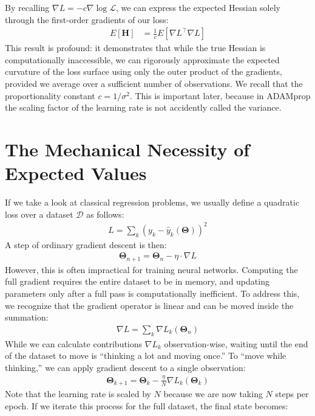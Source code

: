 By recalling $\nabla L = -c \nabla \log \mathcal{L}$, we can express the expected Hessian solely through the first-order gradients of our loss:
\begin{align}
	E[\boldsymbol{H}] &= \frac{1}{c} E\left[ \nabla L^\top \nabla L \right]
\end{align}
This result is profound: it demonstrates that while the true Hessian is computationally inaccessible, we can rigorously approximate the expected curvature of the loss surface using only the outer product of the gradients, provided we average over a sufficient number of observations. We recall that the proportionality constant $c=1/\sigma^2$. This is important later, because in ADAMprop the scaling factor of the learning rate is not accidently called the variance.
\section{The Mechanical Necessity of Expected Values}
If we take a look at classical regression problems, we usually define a quadratic loss over a dataset $\mathcal{D}$ as follows:
\begin{align}
	L = \sum\limits_k \left( y_k - \hat{y}_k(\boldsymbol{\Theta}) \right)^2
\end{align}
A step of ordinary gradient descent is then:
\begin{align}
	\boldsymbol{\Theta}_{n+1} = \boldsymbol{\Theta}_{n} - \eta \cdot \nabla L
\end{align}
However, this is often impractical for training neural networks. Computing the full gradient requires the entire dataset to be in memory, and updating parameters only after a full pass is computationally inefficient. To address this, we recognize that the gradient operator is linear and can be moved inside the summation:
\begin{align}
	\nabla L = \sum\limits_k \nabla L_k(\boldsymbol{\Theta}_n)
\end{align}
While we can calculate contributions $\nabla L_k$ observation-wise, waiting until the end of the dataset to move is \enquote{thinking a lot and moving once.} To \enquote{move while thinking,} we can apply gradient descent to a single observation:
\begin{align}
	\boldsymbol{\Theta}_{k+1} = \boldsymbol{\Theta}_{k} - \frac{\eta}{N} \nabla L_k(\boldsymbol{\Theta}_k)
\end{align}
Note that the learning rate is scaled by $N$ because we are now taking $N$ steps per epoch. If we iterate this process for the full dataset, the final state becomes:
